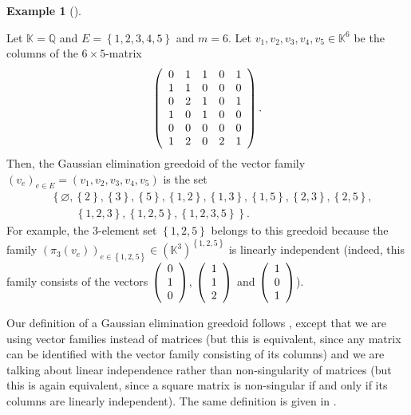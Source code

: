 \documentclass[numbers=enddot,12pt,final,onecolumn,notitlepage]{scrartcl}%
\theoremstyle{definition}
\newtheorem{exam}[theo]{Example}
\newenvironment{example}[1][]
{\begin{exam}[#1]\begin{leftbar}}
{\end{leftbar}\end{exam}}
\theoremstyle{plainsl}
\begin{document}
\begin{example}
\label{exa.geg.matrix2}Let $\mathbb{K}=\mathbb{Q}$ and $E=\left\{
1,2,3,4,5\right\}  $ and $m=6$. Let $v_{1},v_{2},v_{3},v_{4},v_{5}%
\in\mathbb{K}^{6}$ be the columns of the $6\times5$-matrix%
\[
\left(
\begin{array}
[c]{ccccc}%
0 & 1 & 1 & 0 & 1\\
1 & 1 & 0 & 0 & 0\\
0 & 2 & 1 & 0 & 1\\
1 & 0 & 1 & 0 & 0\\
0 & 0 & 0 & 0 & 0\\
1 & 2 & 0 & 2 & 1
\end{array}
\right)  .
\]
Then, the Gaussian elimination greedoid of the vector family $\left(
v_{e}\right)  _{e\in E}=\left(  v_{1},v_{2},v_{3},v_{4},v_{5}\right)  $ is the
set%
\begin{align*}
&  \left\{  \varnothing,\left\{  2\right\}  ,\left\{  3\right\}  ,\left\{
5\right\}  ,\left\{  1,2\right\}  ,\left\{  1,3\right\}  ,\left\{
1,5\right\}  ,\left\{  2,3\right\}  ,\left\{  2,5\right\}  ,\right. \\
&  \ \ \ \ \ \ \ \ \ \ \left.  \left\{  1,2,3\right\}  ,\left\{
1,2,5\right\}  ,\left\{  1,2,3,5\right\}  \right\}  .
\end{align*}
For example, the $3$-element set $\left\{  1,2,5\right\}  $ belongs to this
greedoid because the family $\left(  \pi_{3}\left(  v_{e}\right)  \right)
_{e\in\left\{  1,2,5\right\}  }\in\left(  \mathbb{K}^{3}\right)  ^{\left\{
1,2,5\right\}  }$ is linearly independent (indeed, this family consists of the
vectors $\left(
\begin{array}
[c]{c}%
0\\
1\\
0
\end{array}
\right)  $, $\left(
\begin{array}
[c]{c}%
1\\
1\\
2
\end{array}
\right)  $ and $\left(
\begin{array}
[c]{c}%
1\\
0\\
1
\end{array}
\right)  $).
\end{example}

Our definition of a Gaussian elimination greedoid follows \cite[\S 1.3]%
{Knapp18}, except that we are using vector families instead of matrices (but
this is equivalent, since any matrix can be identified with the vector family
consisting of its columns) and we are talking about linear independence rather
than non-singularity of matrices (but this is again equivalent, since a square
matrix is non-singular if and only if its columns are linearly independent).
The same definition is given in \cite[\S IV.2.3]{KoLoSc91}.
\end{document}
